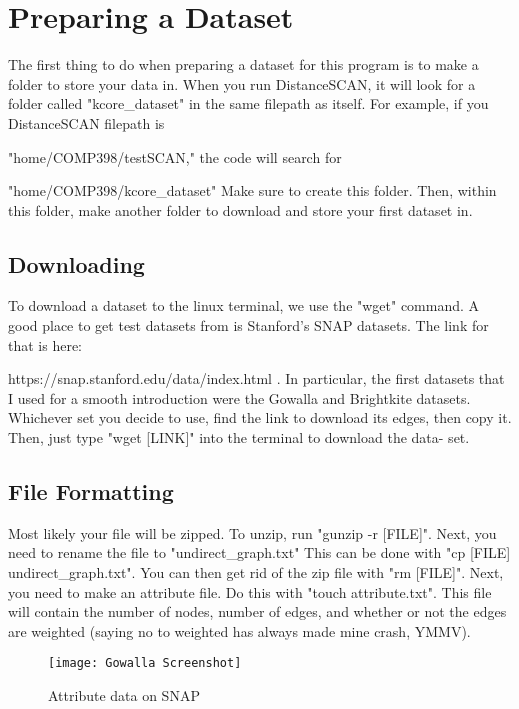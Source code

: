 \documentclass{article}
\begin{document}
\section{Preparing a Dataset}

The first thing to do when preparing a dataset for this program is to make a folder to store your data in.  When you run DistanceSCAN, it will look for a folder called "kcore\_dataset" in the same filepath as itself.  For example, if you DistanceSCAN filepath is

\noindent"home/COMP398/testSCAN," the code will search for

\noindent"home/COMP398/kcore\_dataset"  Make sure to create this folder.  Then, within this folder, make another folder to download and store your first dataset in.

\subsection{Downloading}

To download a dataset to the linux terminal, we use the "wget" command.  A good place to get test datasets from is Stanford's SNAP datasets.  The link for that is here:

\noindent https://snap.stanford.edu/data/index.html .   In particular, the first datasets that I used for a smooth introduction were the Gowalla and Brightkite datasets.  Whichever set you decide to use, find the link to download its edges, then copy it.  Then, just type "wget [LINK]" into the terminal to download the data- set.

\subsection{File Formatting}

Most likely your file will be zipped.  To unzip, run "gunzip -r [FILE]".  Next, you need to rename the file to "undirect\_graph.txt"  This can be done with "cp [FILE] undirect\_graph.txt".  You can then get rid of the zip file with "rm [FILE]".  Next, you need to make an attribute file.  Do this with "touch attribute.txt".
This file will contain the number of nodes, number of edges, and whether or not the edges are weighted (saying no to weighted has always made mine crash, YMMV).    

\begin{figure}[H]
	\centering
	\texttt{[image: Gowalla Screenshot]}
	\caption{Attribute data on SNAP}
	\label{fig:my_label}
\end{figure}
\end{document}
